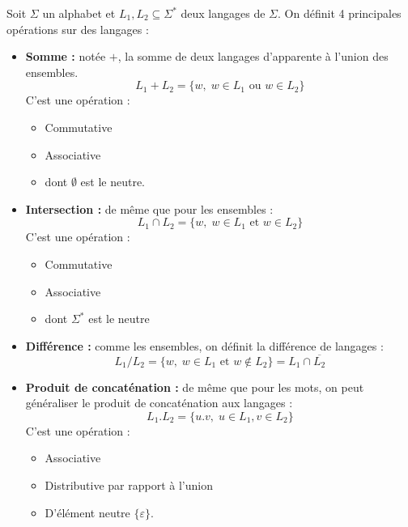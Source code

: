 \begin{definition}
    Soit $\Sigma$ un alphabet et $L_1, L_2 \subseteq \Sigma^*$ deux langages de $\Sigma$. 
    On définit 4 principales opérations sur des langages :
    \begin{itemize}
        \item \textbf{Somme : } notée $+$, la somme de deux langages d'apparente à l'union des ensembles. 
            \[ \boxed{ L_1 + L_2 = \{w, \; w \in L_1 \text{ ou } w \in L_2\} }\] 
        C'est une opération :
            \begin{itemize}
                \item Commutative 
                \item Associative 
                \item dont $\emptyset$ est le neutre. 
            \end{itemize}
        \item \textbf{Intersection : } de même que pour les ensembles :
            \[ \boxed{ L_1 \cap L_2 = \{w, \; w \in L_1 \text{ et } w \in L_2\} }\] 
            C'est une opération : 
            \begin{itemize}
                \item Commutative 
                \item Associative 
                \item dont $\Sigma^*$ est le neutre
            \end{itemize}
        \item \textbf{Différence : } comme les ensembles, on définit la différence de langages :
            \[ \boxed{ L_1 / L_2 = \{w, \; w \in L_1 \text{ et } w \not \in L_2\} = L_1 \cap \overline{L_2} }\] 
        \item \textbf{Produit de concaténation : } de même que pour les mots, on peut généraliser le produit de concaténation 
        aux langages :
            \[ \boxed{L_1 . L_2 = \{ u.v, \; u \in L_1, v \in L_2\} }\] 
        C'est une opération :
        \begin{itemize}
            \item Associative 
            \item Distributive par rapport à l'union 
            \item D'élément neutre $\{\varepsilon\}$. 
        \end{itemize}
    \end{itemize}
\end{definition}

